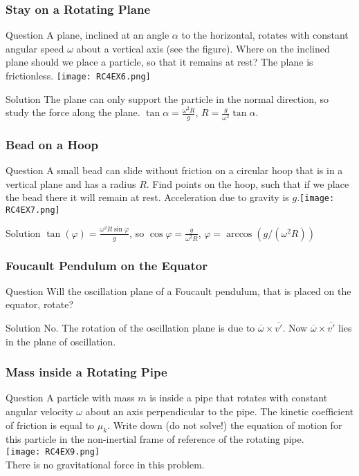 \begin{frame}
\frametitle{Stay on a Rotating Plane}
\begin{block}{Question}
A plane, inclined at an angle $\alpha$ to the horizontal, rotates with constant angular speed $\omega$ about a
vertical axis (see the figure). Where on the inclined plane should we place a particle, so that it
remains at rest? The plane is frictionless. \texttt{[image: RC4EX6.png]}
\end{block}
\begin{block}{Solution}
The plane can only support the particle in the normal direction, so study the force along the plane. $\tan\alpha=\frac{\omega^2 R}{g}$, $R=\frac{g}{\omega^2}\tan\alpha$.
\end{block}
\end{frame}
\begin{frame}
\frametitle{Bead on a Hoop}
\begin{block}{Question}
A small bead can slide without friction on a circular hoop that is in a vertical plane and has a
radius $R$. Find points on the hoop, such that if we place the bead there it will remain at rest.
Acceleration due to gravity is $g$.\texttt{[image: RC4EX7.png]}
\end{block}
\begin{block}{Solution}
$\tan(\varphi)=\frac{\omega^2 R\sin\varphi}{g}$, so $\cos\varphi=\frac{g}{\omega^2 R}$, $\varphi=\arccos(g/(\omega^2 R))$
\end{block}
\end{frame}
\begin{frame}
\frametitle{Foucault Pendulum on the Equator}
\begin{block}{Question}
Will the oscillation plane of a Foucault pendulum, that is placed on the equator, rotate?
\end{block}
\begin{block}{Solution}
No. The rotation of the oscillation plane is due to $\overline{\omega}\times\overline{v'}$. Now $\overline{\omega}\times\overline{v'}$ lies in the plane of oscillation.
\end{block}
\end{frame}
\begin{frame}
\frametitle{Mass inside a Rotating Pipe}
\begin{block}{Question}
A particle with mass $m$ is inside a pipe that rotates with \alert{constant} angular velocity $\omega$ about an axis perpendicular to the pipe. The kinetic coefficient of friction is equal to $\mu_k$. Write down (do not solve!) the equation of motion for this particle in the non-inertial frame of reference of the rotating pipe.\\\texttt{[image: RC4EX9.png]}\\
There is no gravitational force in this problem.
\end{block}
\end{frame}
